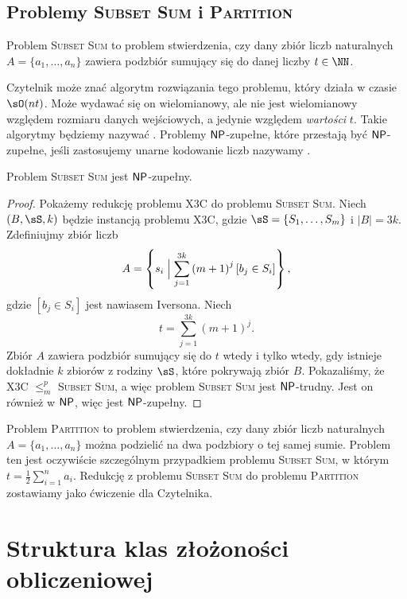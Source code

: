 \subsection{Problemy \textsc{Subset Sum} i \textsc{Partition}}

Problem \textsc{Subset Sum} to problem stwierdzenia, czy dany zbiór liczb naturalnych $A = \{a_1, \ldots, a_n\}$ zawiera podzbiór sumujący się do danej liczby $t \in \NN$.

Czytelnik może znać algorytm rozwiązania tego problemu, który działa w czasie $\sO(nt)$. Może wydawać się on wielomianowy, ale nie jest wielomianowy względem rozmiaru danych wejściowych, a jedynie względem \textit{wartości} $t$. Takie algorytmy będziemy nazywać . Problemy $\textsf{NP}$-zupełne, które przestają być $\textsf{NP}$-zupełne, jeśli zastosujemy unarne kodowanie liczb nazywamy .

\begin{theorem}\label{t:Subset Sum}
    Problem \textsc{Subset Sum} jest $\textsf{NP}$-zupełny.
\end{theorem}
\begin{proof}
    Pokażemy redukcję problemu X3C do problemu \textsc{Subset Sum}. Niech $(B, \sS, k)$ będzie instancją problemu X3C, gdzie $\sS = \{S_1, \ldots, S_m\}$ i $|B| = 3k$. Zdefiniujmy zbiór liczb
    \[ A = \left\{s_i \Bigm| \sum_{j=1}^{3k} \left(m + 1\right)^j \left[b_j \in S_i\right]\right\}, \]
    gdzie $\left[b_j \in S_i\right]$ jest nawiasem Iversona. Niech
    \[ t = \sum_{j=1}^{3k} (m + 1)^j. \]
    Zbiór $A$ zawiera podzbiór sumujący się do $t$ wtedy i tylko wtedy, gdy istnieje dokładnie $k$ zbiorów z rodziny $\sS$, które pokrywają zbiór $B$.
    Pokazaliśmy, że X3C $\leq_m^p$ \textsc{Subset Sum}, a więc problem \textsc{Subset Sum} jest $\textsf{NP}$-trudny. Jest on również w $\textsf{NP}$, więc jest $\textsf{NP}$-zupełny.
\end{proof}

Problem \textsc{Partition} to problem stwierdzenia, czy dany zbiór liczb naturalnych $A = \{a_1, \ldots, a_n\}$ można podzielić na dwa podzbiory o tej samej sumie. Problem ten jest oczywiście szczególnym przypadkiem problemu \textsc{Subset Sum}, w którym $t = \frac{1}{2}\sum_{i=1}^n a_i$. Redukcję z problemu \textsc{Subset Sum} do problemu \textsc{Partition} zostawiamy jako ćwiczenie dla Czytelnika.

\section{Struktura klas złożoności obliczeniowej}

